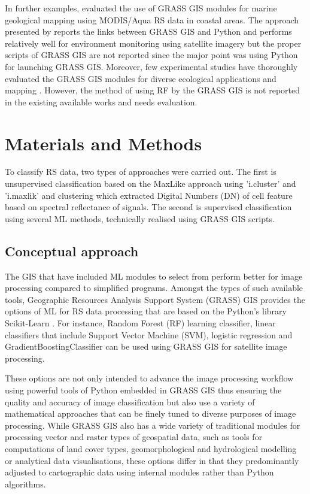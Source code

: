 \documentclass[preprint,12pt,authoryear]{elsarticle}
\begin{document}
In further examples, \cite{7326254} evaluated the use of GRASS GIS modules for marine geological mapping using MODIS/Aqua RS data in coastal areas. The approach presented by \cite{6407912} reports the links between GRASS GIS and Python and performs relatively well for environment monitoring using satellite imagery but the proper scripts of GRASS GIS are not reported since the major point was using Python for launching GRASS GIS. Moreover, few experimental studies have thoroughly evaluated the GRASS GIS modules for diverse ecological applications and mapping \cite{lemenkova2024exploitation}. However, the method of using RF by the GRASS GIS is not reported in the existing available works and needs evaluation. 

\section{Materials and Methods}

To classify RS data, two types of approaches were carried out. The first is unsupervised classification based on the MaxLike approach using 'i.cluster' and 'i.maxlik' and clustering which extracted Digital Numbers (DN) of cell feature based on spectral reflectance of signals. The second is supervised classification using several ML methods, technically realised using GRASS GIS scripts.

\subsection{Conceptual approach}
The GIS that have included ML modules to select from perform better for image processing compared to simplified programs. Amongst the types of such available tools, Geographic Resources Analysis Support System (GRASS) GIS provides the options of ML for RS data processing that are based on the Python's library Scikit-Learn \cite{scikitlearn}. For instance, Random Forest (RF) learning classifier, linear classifiers that include Support Vector Machine (SVM), logistic regression and GradientBoostingClassifier can be used using GRASS GIS for satellite image processing. 

These options are not only intended to advance the image processing workflow using powerful tools of Python embedded in GRASS GIS thus ensuring the quality and accuracy of image classification but also use a variety of mathematical approaches that can be finely tuned to diverse purposes of image processing. While GRASS GIS also has a wide variety of traditional modules for processing vector and raster types of geospatial data, such as tools for computations of land cover types, geomorphological and hydrological modelling or analytical data visualisations, these options differ in that they predominantly adjusted to cartographic data using internal modules rather than Python algorithms. 
\end{document}

